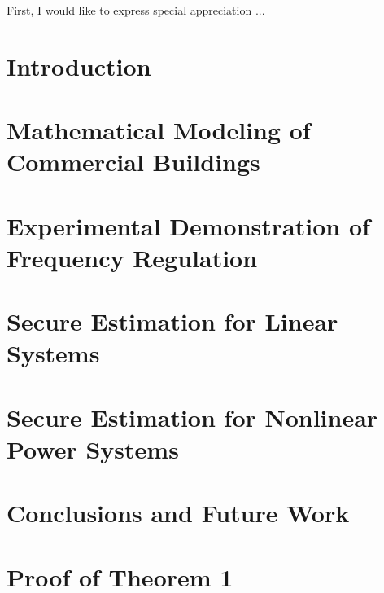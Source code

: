\documentclass[12pt, oneside, final]{lib/ucthesis}
\def\ssp{\def\baselinestretch{1.0}\large\normalsize}
\begin{document}
\tableofcontents

\begin{acknowledgements}
\thispagestyle{plain}

First, I would like to express special appreciation ...

\end{acknowledgements}




\begin{dissertationText}
\chapter{Introduction \label{chapter:intro}}
	
\chapter{Mathematical Modeling of Commercial Buildings \label{chapter:building_model}}
	
\chapter{Experimental Demonstration of Frequency Regulation \label{chapter:building_exp}}
	
\chapter{Secure Estimation for Linear Systems \label{chapter:se_linear}}
	
\chapter{Secure Estimation for Nonlinear Power Systems \label{chapter:se_nonlinear}}
	
\chapter{Conclusions and Future Work \label{chapter:conclusions}}
  



\ssp	%




\appendix
\chapter{Proof of Theorem 1 \label{sec:appendix}}
	

\end{dissertationText}
\end{document}
